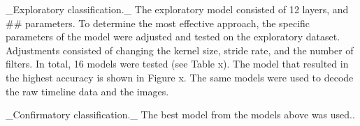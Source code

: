 

_Exploratory classification._ The exploratory model consisted of 12 layers, and ## parameters. To determine the most effective approach, the specific parameters of the model were adjusted and tested on the exploratory dataset. Adjustments consisted of changing the kernel size, stride rate, and the number of filters. In total, 16 models were tested (see Table x). The model that resulted in the highest accuracy is shown in Figure x. The same models were used to decode the raw timeline data and the images.


_Confirmatory classification._ The best model from the models above was used..